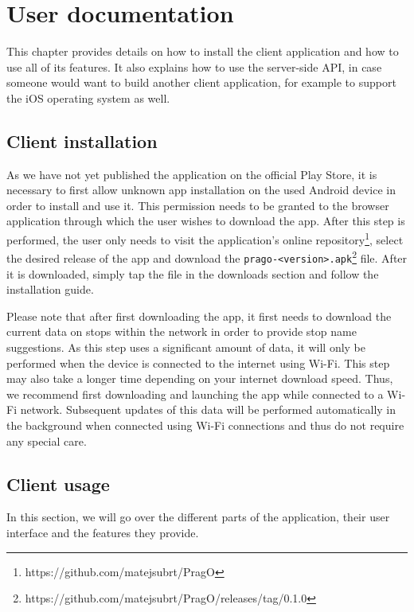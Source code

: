 \chapter{User documentation}

This chapter provides details on how to install the client application and how to use all of its features. It also explains how to use the server-side API, in case someone would want to build another client application, for example to support the iOS operating system as well.

\section{Client installation}

As we have not yet published the application on the official Play Store, it is necessary to first allow unknown app installation on the used Android device in order to install and use it. This permission needs to be granted to the browser application through which the user wishes to download the app. After this step is performed, the user only needs to visit the application's online repository\footnote{https://github.com/matejsubrt/PragO}, select the desired release of the app and download the \texttt{prago-<version>.apk}\footnote{https://github.com/matejsubrt/PragO/releases/tag/0.1.0} file. After it is downloaded, simply tap the file in the downloads section and follow the installation guide. 

Please note that after first downloading the app, it first needs to download the current data on stops within the network in order to provide stop name suggestions. As this step uses a significant amount of data, it will only be performed when the device is connected to the internet using Wi-Fi. This step may also take a longer time depending on your internet download speed. Thus, we recommend first downloading and launching the app while connected to a Wi-Fi network. Subsequent updates of this data will be performed automatically in the background when connected using Wi-Fi connections and thus do not require any special care.

\section{Client usage}
\label{subsec:usage}

In this section, we will go over the different parts of the application, their user interface and the features they provide.

